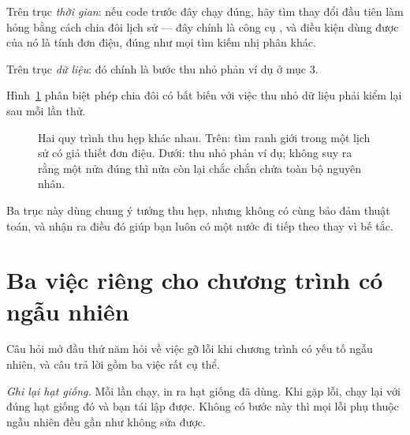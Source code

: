 \documentclass[../../algorithm.tex]{subfiles}
\begin{document}
Trên trục \emph{thời gian}: nếu code trước đây chạy đúng, hãy tìm thay đổi đầu tiên làm hỏng bằng cách chia đôi lịch sử --- đây chính là công cụ , và điều kiện dùng được của nó là tính đơn điệu, đúng như mọi tìm kiếm nhị phân khác.

Trên trục \emph{dữ liệu}: đó chính là bước thu nhỏ phản ví dụ ở mục 3.

Hình~\ref{fig:bisect-3axes} phân biệt phép chia đôi có bất biến với việc thu nhỏ dữ liệu phải kiểm lại sau mỗi lần thử.
\begin{figure}[H]\centering
{}
\caption{Hai quy trình thu hẹp khác nhau. Trên: tìm ranh giới trong một lịch sử có giả thiết đơn điệu. Dưới: thu nhỏ phản ví dụ; không suy ra rằng một nửa đúng thì nửa còn lại chắc chắn chứa toàn bộ nguyên nhân.}
\label{fig:bisect-3axes}
\end{figure}

Ba trục này dùng chung ý tưởng thu hẹp, nhưng không có cùng bảo đảm thuật toán, và nhận ra điều đó giúp bạn luôn có một nước đi tiếp theo thay vì bế tắc.

\section{Ba việc riêng cho chương trình có ngẫu nhiên}

Câu hỏi mở đầu thứ năm hỏi về việc gỡ lỗi khi chương trình có yếu tố ngẫu nhiên, và câu trả lời gồm ba việc rất cụ thể.

\emph{Ghi lại hạt giống.} Mỗi lần chạy, in ra hạt giống đã dùng. Khi gặp lỗi, chạy lại với đúng hạt giống đó và bạn tái lập được. Không có bước này thì mọi lỗi phụ thuộc ngẫu nhiên đều gần như không sửa được.
\end{document}
